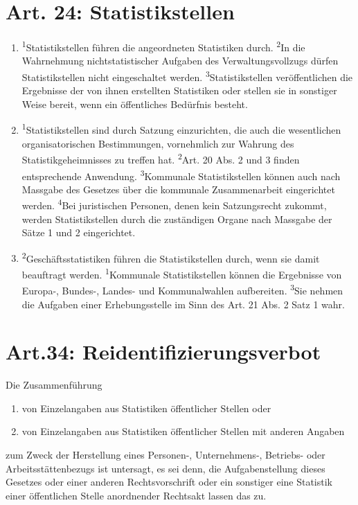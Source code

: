 \documentclass[A4, 12pt]{scrbook}
\begin{document}
    \section{Art. 24: Statistikstellen}
        \begin{enumerate}[label=(\arabic*)]
            \item \textsuperscript{1}Statistikstellen führen die angeordneten Statistiken durch. \textsuperscript{2}In die Wahrnehmung nichtstatistischer Aufgaben des Verwaltungsvollzugs dürfen Statistikstellen nicht eingeschaltet werden. \textsuperscript{3}Statistikstellen veröffentlichen die Ergebnisse der von ihnen erstellten Statistiken oder stellen sie in sonstiger Weise bereit, wenn ein öffentliches Bedürfnis besteht.
            \item \textsuperscript{1}Statistikstellen sind durch Satzung einzurichten, die auch die wesentlichen organisatorischen Bestimmungen, vornehmlich zur Wahrung des Statistikgeheimnisses zu treffen hat. \textsuperscript{2}Art. 20 Abs. 2 und 3 finden entsprechende Anwendung. \textsuperscript{3}Kommunale Statistikstellen können auch nach Massgabe des Gesetzes über die kommunale Zusammenarbeit eingerichtet werden. \textsuperscript{4}Bei juristischen Personen, denen kein Satzungsrecht zukommt, werden Statistikstellen durch die zuständigen Organe nach Massgabe der Sätze 1 und 2 eingerichtet.
            \item  \textsuperscript{2}Geschäftsstatistiken führen die Statistikstellen durch, wenn sie damit beauftragt werden. \textsuperscript{1}Kommunale Statistikstellen können die Ergebnisse von Europa-, Bundes-, Landes- und Kommunalwahlen aufbereiten. \textsuperscript{3}Sie nehmen die Aufgaben einer Erhebungsstelle im Sinn des Art. 21 Abs. 2 Satz 1 wahr.
        \end{enumerate}
        
    \section{Art.34: Reidentifizierungsverbot}
        Die Zusammenführung
        \begin{enumerate}[label=\arabic*.]
            \item von Einzelangaben aus Statistiken öffentlicher Stellen oder
            \item von Einzelangaben aus Statistiken öffentlicher Stellen mit anderen Angaben
        \end{enumerate}
         zum Zweck der Herstellung eines Personen-, Unternehmens-, Betriebs- oder Ar\-beits\-stät\-ten\-be\-zugs ist untersagt, es sei denn, die Aufgabenstellung dieses Gesetzes oder einer anderen Rechtsvorschrift oder ein sonstiger eine Statistik einer öffentlichen Stelle anordnender Rechtsakt lassen das zu. 
     
\end{document}

